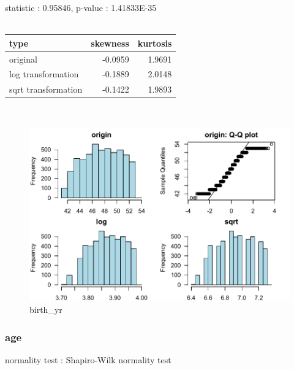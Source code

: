 \documentclass{book}\usepackage[]{graphicx}\usepackage[]{color}
\begin{document}
\noindent statistic : 0.95846,  p-value : 1.41833E-35\\
\\%
\begin{tabular}{lrr}
  \toprule
type & skewness & kurtosis \\ 
  \midrule
original & -0.0959 & 1.9691 \\ 
  log transformation & -0.1889 & 2.0148 \\ 
  sqrt transformation & -0.1422 & 1.9893 \\ 
   \bottomrule
\end{tabular}
\\
\begin{figure}[!ht]
\centering
\includegraphics[width=1.0\textwidth]{figure/norm3.pdf}
\caption{birth\_yr}
\end{figure}
\clearpage
\subsubsection{ age }

normality test : Shapiro-Wilk normality test
\end{document}
